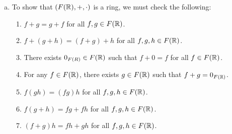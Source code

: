 \documentclass[11pt,fleqn,dvipsnames,usenames]{article}
\begin{document}
\begin{enumerate}[1.]
\solution

\begin{enumerate}[(a)]
\item To show that $(F(\mathbb{R}), +, \cdot)$ is a ring, we must check the following:
\begin{enumerate}[(1)]
\item $f + g  = g + f$ for all $f,g\in F(\mathbb{R})$.
\item $f + (g + h) = (f + g) + h$ for all $f,g,h \in F(\mathbb{R})$.
\item There exists $0_{F(R)}\in F(\mathbb{R})$ such that $f + 0 = f$ for all $f\in F(\mathbb{R})$.
\item For any $f\in F(\mathbb{R})$, there exists $g\in F(\mathbb{R})$ such that $f + g = 0_{F(\mathbb{R})}$.
\item $f(gh) = (fg)h$ for all $f,g,h \in F(\mathbb{R})$.
\item $f(g+h) = fg + fh$ for all $f,g,h \in F(\mathbb{R})$.
\item $(f+g)h = fh + gh$ for all $f,g,h \in F(\mathbb{R})$.
\end{enumerate}


\end{enumerate}
\end{enumerate}
\end{document}
